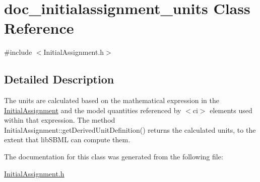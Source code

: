 \hypertarget{classdoc__initialassignment__units}{}\section{doc\+\_\+initialassignment\+\_\+units Class Reference}
\label{classdoc__initialassignment__units}


{\ttfamily \#include $<$Initial\+Assignment.\+h$>$}



\subsection{Detailed Description}
\begin{DoxyParagraph}{}
The units are calculated based on the mathematical expression in the \hyperlink{class_initial_assignment}{Initial\+Assignment} and the model quantities referenced by {\ttfamily $<$ci$>$} elements used within that expression. The method Initial\+Assignment\+::get\+Derived\+Unit\+Definition() returns the calculated units, to the extent that lib\+S\+B\+ML can compute them. 
\end{DoxyParagraph}


The documentation for this class was generated from the following file\+:\begin{DoxyCompactItemize}
\item 
\hyperlink{_initial_assignment_8h}{Initial\+Assignment.\+h}\end{DoxyCompactItemize}
